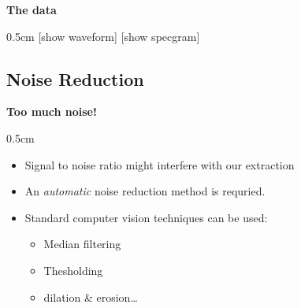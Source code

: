 \documentclass[t, xcolor={dvipsnames}]{beamer}
\begin{document}
\begin{frame}[fragile]
  \vspace{0.5cm}
  {\bfseries\Large The data}
  \vspace{0.5cm}
  \begin{addmargin}{0.5cm}
    [show waveform]
    [show specgram]
  \end{addmargin}
\end{frame}



\subsection{Noise Reduction}

\begin{frame}[fragile]
  \vspace{0.5cm}
  {\bfseries\Large Too much noise!}\\
  \vspace{0.5cm}
  \begin{addmargin}{0.5cm}
    \begin{itemize}
      \item Signal to noise ratio might interfere with our extraction
      \item An \emph{automatic} noise reduction method is requried.
      \item Standard computer vision techniques can be used:
      \begin{itemize}
        \item Median filtering
        \item Thesholding
        \item dilation \& erosion\ldots
      \end{itemize}
    \end{itemize}
  \end{addmargin}
\end{frame}

%
%
\end{document}
